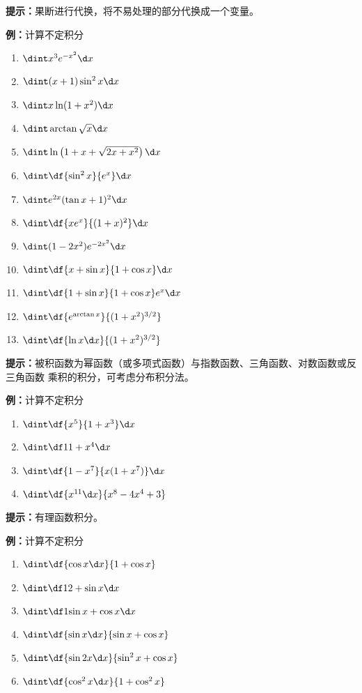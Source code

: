 \begin{shaded}
{\bf 提示：}果断进行代换，将不易处理的部分代换成一个变量。
\end{shaded}

{\bf 例：}计算不定积分
\begin{enumerate}[(1)]
  \setlength{\itemindent}{1cm}
  \item $\dint x^3e^{-x^2}\d x$
  \item $\dint (x+1)\sin^2x\d x$
  \item $\dint x\ln(1+x^2)\d x$
  \item $\dint\arctan\sqrt x\d x$
  \item $\dint\ln\left(1+x+\sqrt{2x+x^2}\right)\d x$
  \item $\dint\df{\sin^2x}{e^x}\d x$
  \item $\dint e^{2x}(\tan x+1)^2\d x$
  \item $\dint\df{xe^x}{(1+x)^2}\d x$
  \item $\dint(1-2x^2)e^{-2x^2}\d x$
  \item $\dint\df{x+\sin x}{1+\cos x}\d x$
  \item $\dint\df{1+\sin x}{1+\cos x}e^x\d x$
  \item $\dint\df{e^{\arctan x}}{(1+x^2)^{3/2}}$
  \item $\dint\df{\ln x\d x}{(1+x^2)^{3/2}}$
\end{enumerate}

\begin{shaded}
{\bf 提示：}被积函数为幂函数（或多项式函数）与指数函数、三角函数、对数函数或反三角函数
乘积的积分，可考虑分布积分法。
\end{shaded}

{\bf 例：}计算不定积分
\begin{enumerate}[(1)]
  \setlength{\itemindent}{1cm}
  \item $\dint\df{x^5}{1+x^3}\d x$
  \item $\dint\df1{1+x^4}\d x$
  \item $\dint\df{1-x^7}{x(1+x^7)}\d x$
  \item $\dint\df{x^{11}\d x}{x^8-4x^4+3}$
\end{enumerate}

\begin{shaded}
{\bf 提示：}有理函数积分。
\end{shaded}

{\bf 例：}计算不定积分
\begin{enumerate}[(1)]
  \setlength{\itemindent}{1cm}
  \item $\dint\df{\cos x\d x}{1+\cos x}$
  \item $\dint\df1{2+\sin x}\d x$
  \item $\dint\df1{\sin x+\cos x}\d x$
  \item $\dint\df{\sin x\d x}{\sin x+\cos x}$
  \item $\dint\df{\sin2x\d x}{\sin^2x+\cos x}$
  \item $\dint\df{\cos^2x\d x}{1+\cos^2x}$
\end{enumerate}

